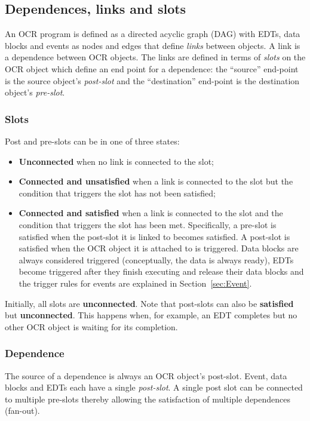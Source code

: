 \subsection{Dependences, links and slots}
\label{sec:OCRlinks}
An OCR program is defined as a directed acyclic graph (DAG)
with EDTs, data blocks and events as nodes and edges that define
\emph{links} between objects. A link is a dependence
between OCR objects. The links are defined in terms of
\emph{slots} on the OCR object which define an end
point for a dependence: the ``source'' end-point is the source object's
\emph{post-slot} and the ``destination'' end-point is the destination
object's \emph{pre-slot}.
\subsubsection{Slots}
Post and pre-slots can be in one of three states:
\begin{itemize}
\item {\bf Unconnected} when no link is connected to the slot;
\item {\bf Connected and unsatisfied} when a link is connected to the
  slot but the condition that triggers the slot has not been
  satisfied;
\item {\bf Connected and satisfied}
  when a link is connected to the
  slot and the condition that triggers the slot has been
  met. Specifically, a pre-slot is satisfied when the post-slot it is
  linked to becomes satisfied. A post-slot is satisfied when the
  OCR object it is attached to is triggered. Data
  blocks are always considered triggered (conceptually, the data is
  always ready), EDTs become triggered after they finish executing and
  release their data blocks and the trigger rules for events are
  explained in Section~\ref{sec:Event}.
\end{itemize}
Initially, all slots are {\bf unconnected}. Note that post-slots can also
be {\bf satisfied} but {\bf unconnected}. This happens when, for
example, an EDT completes but no other OCR object is waiting for its completion.
\subsubsection{Dependence}
The source of a dependence is always an OCR object's post-slot.
Event, data blocks and EDTs each have a
single \emph{post-slot}. A single post slot can be connected
to multiple pre-slots thereby allowing the satisfaction of multiple
dependences (fan-out).

